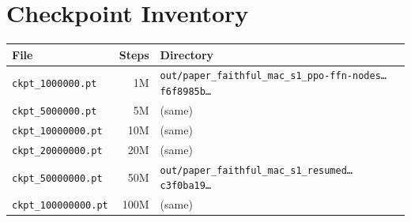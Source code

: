 \documentclass[11pt,a4paper]{article}
\begin{document}
\section{Checkpoint Inventory}\label{sec:checkpoints}

\begin{table}[h]
\centering
\small
\begin{tabular}{lrl}
  \toprule
  \textbf{File} & \textbf{Steps} & \textbf{Directory} \\
  \midrule
  \texttt{ckpt\_1000000.pt}    & 1M   & \texttt{out/paper\_faithful\_mac\_s1\_ppo-ffn-nodes\ldots f6f8985b\ldots} \\
  \texttt{ckpt\_5000000.pt}    & 5M   & (same) \\
  \texttt{ckpt\_10000000.pt}   & 10M  & (same) \\
  \texttt{ckpt\_20000000.pt}   & 20M  & (same) \\
  \texttt{ckpt\_50000000.pt}   & 50M  & \texttt{out/paper\_faithful\_mac\_s1\_resumed\ldots c3f0ba19\ldots} \\
  \texttt{ckpt\_100000000.pt}  & 100M & (same) \\
  \bottomrule
\end{tabular}
\end{table}
\end{document}
